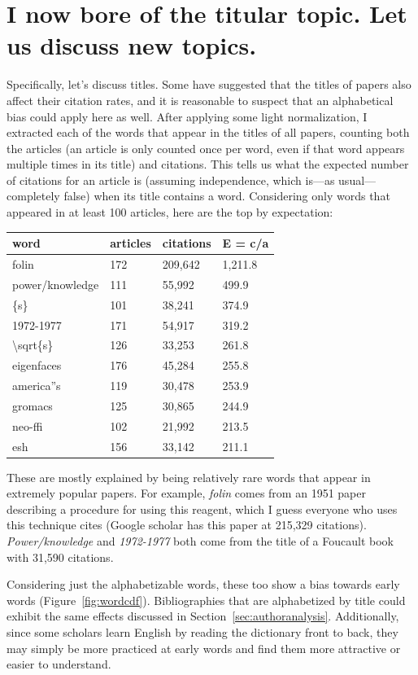 \documentclass[twocolumn]{article}
\begin{document}
\section{I now bore of the titular topic. Let us discuss new topics.}

Specifically, let's discuss titles. Some have suggested that the
titles of papers also affect their citation rates, and it is
reasonable to suspect that an alphabetical bias could apply here as
well. After applying some light normalization, I extracted each of the
words that appear in the titles of all papers, counting both the
articles (an article is only counted once per word, even if that word
appears multiple times in its title) and citations. This tells us
what the expected number of citations for an article is (assuming
independence, which is---as usual---completely false) when its
title contains a word. Considering only words that appeared in
at least 100 articles, here are the top by expectation:

\begin{tabular}{l|l|l|l}
{\bf word} & {\bf articles} & {\bf citations} & {\bf E = c/a} \\
  \hline
folin & 172 & 209,642 & 1,211.8 \\
power/knowledge & 111 & 55,992 & 499.9 \\
\{s\} & 101 & 38,241 & 374.9 \\
1972-1977 & 171 & 54,917 & 319.2 \\
\textbackslash sqrt\{s\} & 126 & 33,253 & 261.8 \\
eigenfaces & 176 & 45,284 & 255.8 \\
america''s & 119 & 30,478 & 253.9 \\
gromacs & 125 & 30,865 & 244.9 \\
neo-ffi & 102 & 21,992 & 213.5 \\
esh & 156 & 33,142 & 211.1 \\
\end{tabular}

These are mostly explained by being relatively rare words that appear
in extremely popular papers. For example, {\em folin} comes from an
1951 paper\cite{lowry1951protein} describing a procedure for using
this reagent, which I guess everyone who uses this technique cites
(Google scholar has this paper at 215,329 citations). {\em
  Power/knowledge} and {\em 1972-1977} both come from the title of a
Foucault book\cite{foucault1980power} with 31,590 citations.

Considering just the alphabetizable words, these too show a bias
towards early words (Figure~\ref{fig:wordcdf}). Bibliographies that
are alphabetized by title could exhibit the same effects discussed in
Section~\ref{sec:authoranalysis}. Additionally, since some scholars
learn English by reading the dictionary front to back, they may
simply be more practiced at early words and find them more attractive
or easier to understand.
\end{document}
